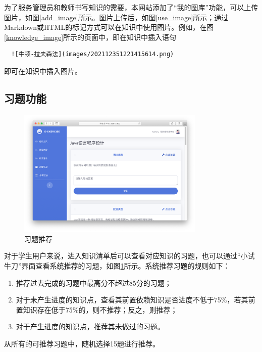 \documentclass{nwafucoursepaper}
\begin{document}
为了服务管理员和教师书写知识的需要，本网站添加了“我的图库”功能，可以上传图片，如图\ref{add_image}所示。图片上传后，如图\ref{use_image}所示；通过Markdown或HTML的标记方式可以在知识中使用图片。例如，在图\ref{knowledge_image}所示的页面中，即在知识中插入语句
\begin{lstlisting}
  ![牛顿-拉夫森法](images/202112351221415614.png)
\end{lstlisting}
即可在知识中插入图片。

\newpage

\subsection{习题功能}

\begin{figure}[htp]
  \centering
  \includegraphics[width=0.8\textwidth]{recommend_exercise.png}
  \caption{习题推荐}
  \label{recommend_exercise}
\end{figure}

对于学生用户来说，进入知识清单后可以查看对应知识的习题，也可以通过“小试牛刀”界面查看系统推荐的习题，如图\ref{recommend_exercise}所示。系统推荐习题的规则如下：
\begin{enumerate}
  \item 推荐过去完成的习题中最高分不超过85分的习题；
  \item 对于未产生进度的知识点，查看其前置依赖知识是否进度不低于75\%，若其前置知识存在低于75\%的，则不推荐；反之，则推荐；
  \item 对于产生进度的知识点，推荐其未做过的习题。
\end{enumerate}
从所有的可推荐习题中，随机选择15题进行推荐。
\end{document}
